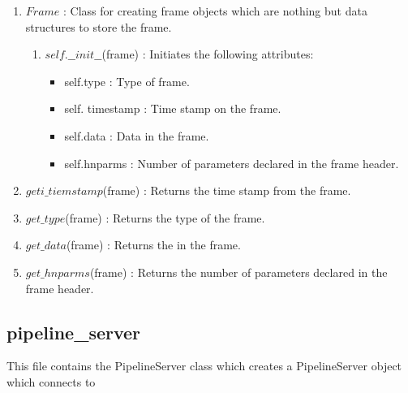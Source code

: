 \begin{enumerate}
\begin{enumerate}
		\end{enumerate}
	\item $Frame$ : Class for creating frame objects which are nothing but data
		structures to store the frame.
		\begin{enumerate}
			\item $self.\_\_init\_\_$(frame) : Initiates the following attributes:
				\begin{itemize}
					\item self.type : Type of frame.
					\item self. timestamp : Time stamp on the frame.
					\item self.data : Data in the frame.
					\item self.hnparms : Number of parameters declared in the
						frame header.
				\end{itemize}
		\end{enumerate}
	\item $geti\_tiemstamp$(frame) : Returns the time stamp from the frame.
	\item $get\_type$(frame) : Returns the type of the frame.
	\item $get\_data$(frame) : Returns the in the frame.
	\item $get\_hnparms$(frame) : Returns the number of parameters declared in
		the frame header.
\end{enumerate}



\subsection{pipeline\_server}
This file contains the PipelineServer class which creates a PipelineServer
object which connects to
